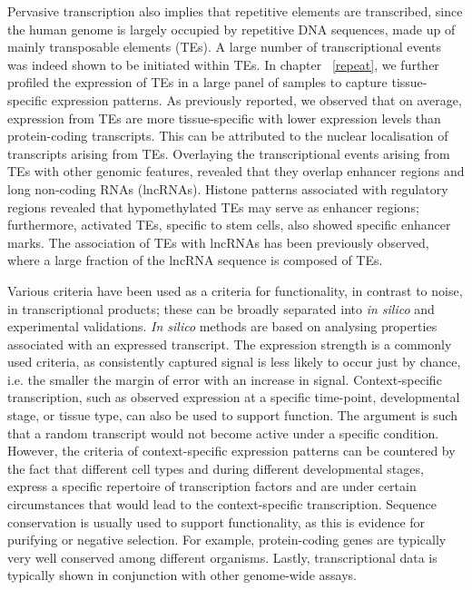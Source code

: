 Pervasive transcription also implies that repetitive elements are transcribed, since the human genome is largely occupied by repetitive DNA sequences, made up of mainly transposable elements (TEs). A large number of transcriptional events was indeed shown to be initiated within TEs\cite{pmid19377475}. In chapter ~\ref{repeat}, we further profiled the expression of TEs in a large panel of samples to capture tissue-specific expression patterns. As previously reported, we observed that on average, expression from TEs are more tissue-specific with lower expression levels than protein-coding transcripts. This can be attributed to the nuclear localisation of transcripts arising from TEs\cite{pmid24777452}. Overlaying the transcriptional events arising from TEs with other genomic features, revealed that they overlap enhancer regions and long non-coding RNAs (lncRNAs). Histone patterns associated with regulatory regions revealed that hypomethylated TEs may serve as enhancer regions\cite{pmid23708189}; furthermore, activated TEs, specific to stem cells, also showed specific enhancer marks\cite{pmid24777452}. The association of TEs with lncRNAs has been previously observed, where a large fraction of the lncRNA sequence is composed of TEs\cite{pmid25218058, pmid23181609}.

Various criteria have been used as a criteria for functionality, in contrast to noise, in transcriptional products; these can be broadly separated into \textit{in silico} and experimental validations. \textit{In silico} methods are based on analysing properties associated with an expressed transcript. The expression strength is a commonly used criteria, as consistently captured signal is less likely to occur just by chance, i.e. the smaller the margin of error with an increase in signal. Context-specific transcription, such as observed expression at a specific time-point, developmental stage, or tissue type, can also be used to support function. The argument is such that a random transcript would not become active under a specific condition. However, the criteria of context-specific expression patterns can be countered by the fact that different cell types and during different developmental stages, express a specific repertoire of transcription factors and are under certain circumstances that would lead to the context-specific transcription. Sequence conservation is usually used to support functionality, as this is evidence for purifying or negative selection. For example, protein-coding genes are typically very well conserved among different organisms. Lastly, transcriptional data is typically shown in conjunction with other genome-wide assays.

